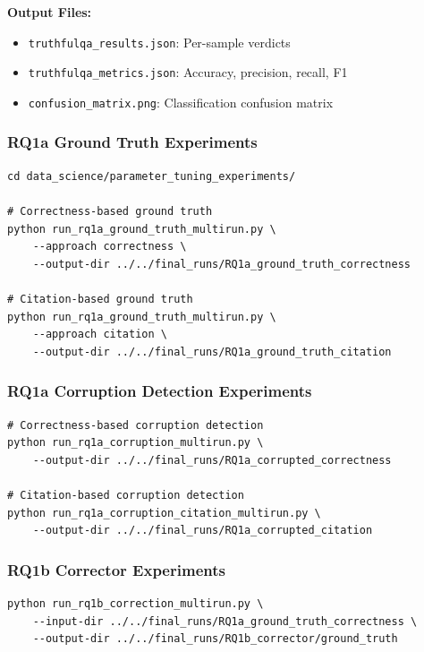 \textbf{Output Files:}
\begin{itemize}[noitemsep]
    \item \texttt{truthfulqa\_results.json}: Per-sample verdicts
    \item \texttt{truthfulqa\_metrics.json}: Accuracy, precision, recall, F1
    \item \texttt{confusion\_matrix.png}: Classification confusion matrix
\end{itemize}

\subsubsection{RQ1a Ground Truth Experiments}

\begin{verbatim}
cd data_science/parameter_tuning_experiments/

# Correctness-based ground truth
python run_rq1a_ground_truth_multirun.py \
    --approach correctness \
    --output-dir ../../final_runs/RQ1a_ground_truth_correctness

# Citation-based ground truth
python run_rq1a_ground_truth_multirun.py \
    --approach citation \
    --output-dir ../../final_runs/RQ1a_ground_truth_citation
\end{verbatim}

\subsubsection{RQ1a Corruption Detection Experiments}

\begin{verbatim}
# Correctness-based corruption detection
python run_rq1a_corruption_multirun.py \
    --output-dir ../../final_runs/RQ1a_corrupted_correctness

# Citation-based corruption detection
python run_rq1a_corruption_citation_multirun.py \
    --output-dir ../../final_runs/RQ1a_corrupted_citation
\end{verbatim}

\subsubsection{RQ1b Corrector Experiments}

\begin{verbatim}
python run_rq1b_correction_multirun.py \
    --input-dir ../../final_runs/RQ1a_ground_truth_correctness \
    --output-dir ../../final_runs/RQ1b_corrector/ground_truth
\end{verbatim}

